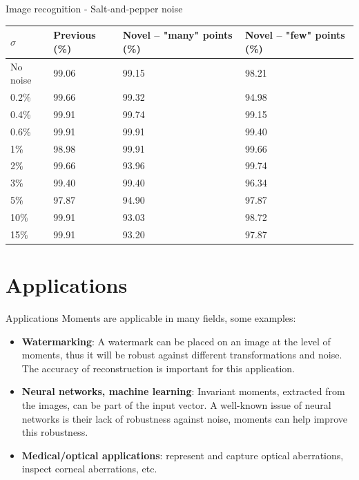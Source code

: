 \documentclass{beamer}
\begin{document}
\begin{frame}{Image recognition - Salt-and-pepper noise}
    \vskip 1cm
    \begin{table}[tbp]
        \centering
        \begin{tabular}{|p{1.5cm}|p{2.2cm}|p{2.7cm}|p{2.5cm}|} \hline
            $\sigma$ & \textbf{Previous} (\%) & \textbf{Novel} -- "many" points (\%)& \textbf{Novel} -- "few" points (\%) \\ \hline\hline
            No noise & 99.06 & 99.15 & 98.21 \\ \hline
            0.2\% & 99.66 & 99.32 & 94.98 \\ \hline
            0.4\% & 99.91 & 99.74 & 99.15 \\ \hline
            0.6\% & 99.91 & 99.91 & 99.40 \\ \hline
            1\% & 98.98 & 99.91 & 99.66 \\ \hline
            2\% & 99.66 & 93.96 & 99.74 \\ \hline
            3\% & 99.40 & 99.40 & 96.34 \\ \hline
            5\% & 97.87 & 94.90 & 97.87 \\ \hline
            10\% & 99.91 & 93.03 & 98.72 \\ \hline
            15\% & 99.91 & 93.20 & 97.87 \\ \hline
        \end{tabular}
    \end{table}
\end{frame}

\section{Applications}
\begin{frame}{Applications}
    Moments are applicable in many fields, some examples:
    \begin{itemize}
    \item \textbf{Watermarking}: 
    A watermark can be placed on an image at the level of moments, thus it will be robust against different transformations and noise. The accuracy of reconstruction is important for this application.
    \item \textbf{Neural networks, machine learning}: 
    Invariant moments, extracted from the images, can be part of the input vector. A well-known issue of neural networks is their lack of robustness against noise, moments can help improve this robustness.
    \item \textbf{Medical/optical applications}: represent and capture optical aberrations, inspect corneal aberrations, etc.
    \end{itemize}
\end{frame}
\end{document}
